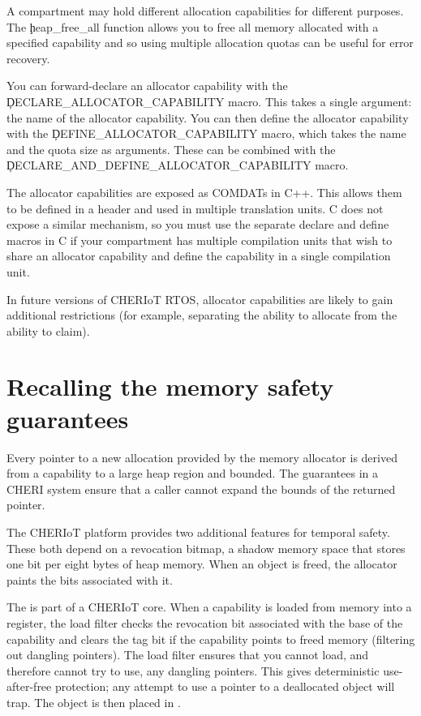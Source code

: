 A compartment may hold different allocation capabilities for different purposes.
The \c{heap_free_all} function allows you to free all memory allocated with a specified capability and so using multiple allocation quotas can be useful for error recovery.

You can forward-declare an allocator capability with the \c{DECLARE_ALLOCATOR_CAPABILITY} macro.
This takes a single argument: the name of the allocator capability.
You can then define the allocator capability with the \c{DEFINE_ALLOCATOR_CAPABILITY} macro, which takes the name and the quota size as arguments.
These can be combined with the \c{DECLARE_AND_DEFINE_ALLOCATOR_CAPABILITY} macro.

\begin{caution}
The allocator capabilities are exposed as COMDATs in C++.
This allows them to be defined in a header and used in multiple translation units.
C does not expose a similar mechanism, so you must use the separate declare and define macros in C if your compartment has multiple compilation units that wish to share an allocator capability and define the capability in a single compilation unit.
\end{caution}

In future versions of CHERIoT RTOS, allocator capabilities are likely to gain additional restrictions (for example, separating the ability to allocate from the ability to claim).

\section{Recalling the memory safety guarantees}

Every pointer to a new allocation provided by the memory allocator is derived from a capability to a large heap region and bounded.
The  guarantees in a CHERI system ensure that a caller cannot expand the bounds of the returned pointer.

The CHERIoT platform provides two additional features for temporal safety.
These both depend on a revocation bitmap, a shadow memory space that stores one bit per eight bytes of heap memory.
When an object is freed, the allocator paints the bits associated with it.

The  is part of a CHERIoT core.
When a capability is loaded from memory into a register, the load filter checks the revocation bit associated with the base of the capability and clears the tag bit if the capability points to freed memory (filtering out dangling pointers).
The load filter ensures that you cannot load, and therefore cannot try to use, any dangling pointers.
This gives deterministic use-after-free protection; any attempt to use a pointer to a deallocated object will trap.
The object is then placed in .

